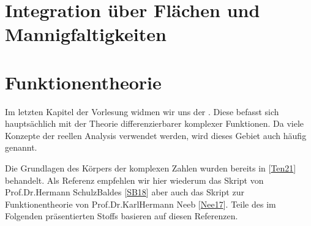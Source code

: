 \documentclass[letterpaper,10pt,german]{jupyterBook}
\begin{document}
\chapter{Integration über Flächen und Mannigfaltigkeiten}
\label{\detokenize{surfaceintegrals/surfaceintegrals:integration-uber-flachen-und-mannigfaltigkeiten}}\label{\detokenize{surfaceintegrals/surfaceintegrals::doc}}

\chapter{Funktionentheorie}
\label{\detokenize{complexanalysis/complexanalysis:funktionentheorie}}\label{\detokenize{complexanalysis/complexanalysis::doc}}
\sphinxAtStartPar
Im letzten Kapitel der Vorlesung widmen wir uns der .
Diese befasst sich hauptsächlich mit der Theorie differenzierbarer komplexer Funktionen.
Da viele Konzepte der reellen Analysis verwendet werden, wird dieses Gebiet auch häufig  genannt.

\sphinxAtStartPar
Die Grundlagen des Körpers der komplexen Zahlen wurden bereits in {[}\hyperlink{cite.references:id15}{Ten21}{]} behandelt. Als Referenz empfehlen wir hier wiederum das Skript von Prof.Dr.Hermann Schulz\sphinxhyphen{}Baldes {[}\hyperlink{cite.references:id12}{SB18}{]} aber auch das Skript zur Funktionentheorie von Prof.Dr.Karl\sphinxhyphen{}Hermann Neeb {[}\hyperlink{cite.references:id13}{Nee17}{]}. Teile des im Folgenden präsentierten Stoffs basieren auf diesen Referenzen.
\end{document}
